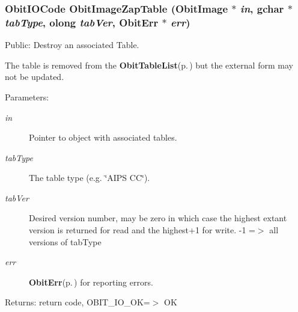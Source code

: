 \subsubsection{\setlength{\rightskip}{0pt plus 5cm}Obit\-IOCode Obit\-Image\-Zap\-Table ({\bf Obit\-Image} $\ast$ {\em in}, gchar $\ast$ {\em tab\-Type}, {\bf olong} {\em tab\-Ver}, {\bf Obit\-Err} $\ast$ {\em err})}\label{ObitImage_8h_a36}


Public: Destroy an associated Table. 

The table is removed from the {\bf Obit\-Table\-List}{\rm (p.\,\pageref{structObitTableList})} but the external form may not be updated. \begin{Desc}
\item[Parameters:]
\begin{description}
\item[{\em in}]Pointer to object with associated tables. \item[{\em tab\-Type}]The table type (e.g. \char`\"{}AIPS CC\char`\"{}). \item[{\em tab\-Ver}]Desired version number, may be zero in which case the highest extant version is returned for read and the highest+1 for write. -1 =$>$ all versions of tab\-Type \item[{\em err}]{\bf Obit\-Err}{\rm (p.\,\pageref{structObitErr})} for reporting errors. \end{description}
\end{Desc}
\begin{Desc}
\item[Returns:]return code, OBIT\_\-IO\_\-OK=$>$ OK \end{Desc}
